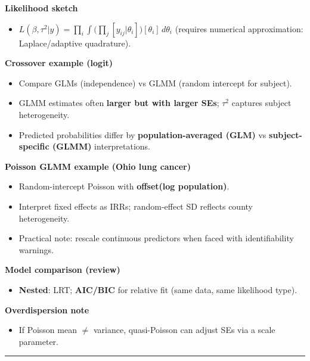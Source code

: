\documentclass[
  letterpaper,
  DIV=11,
  numbers=noendperiod]{scrreprt}
\providecommand{\tightlist}{%
  \setlength{\itemsep}{0pt}\setlength{\parskip}{0pt}}\usepackage{longtable,booktabs,array}
\begin{document}
\textbf{Likelihood sketch}

\begin{itemize}
\tightlist
\item
  \(L(\beta,\tau^2|y) = \prod_i \int \big(\prod_j [y_{ij}|\theta_i]\big)[\theta_i]\,d\theta_i\)
  (requires numerical approximation: Laplace/adaptive quadrature).
\end{itemize}

\textbf{Crossover example (logit)}

\begin{itemize}
\tightlist
\item
  Compare GLMs (independence) vs GLMM (random intercept for subject).
\item
  GLMM estimates often \textbf{larger but with larger SEs}; \(\tau^2\)
  captures subject heterogeneity.
\item
  Predicted probabilities differ by \textbf{population-averaged (GLM)}
  vs \textbf{subject-specific (GLMM)} interpretations.
\end{itemize}

\textbf{Poisson GLMM example (Ohio lung cancer)}

\begin{itemize}
\tightlist
\item
  Random-intercept Poisson with \textbf{offset(log population)}.
\item
  Interpret fixed effects as IRRs; random-effect SD reflects county
  heterogeneity.
\item
  Practical note: rescale continuous predictors when faced with
  identifiability warnings.
\end{itemize}

\textbf{Model comparison (review)}

\begin{itemize}
\tightlist
\item
  \textbf{Nested}: LRT; \textbf{AIC/BIC} for relative fit (same data,
  same likelihood type).
\end{itemize}

\textbf{Overdispersion note}

\begin{itemize}
\tightlist
\item
  If Poisson mean \(\neq\) variance, quasi-Poisson can adjust SEs via a
  scale parameter.
\end{itemize}

\begin{center}\rule{0.5\linewidth}{0.5pt}\end{center}
\end{document}
